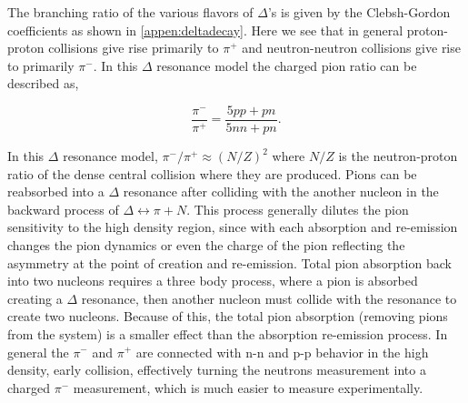 The branching ratio of the various flavors of $\Delta$'s is given by the Clebsh-Gordon coefficients as shown in \ref{appen:deltadecay}. Here we see that in general proton-proton collisions give rise primarily to  $\pi^+$ and neutron-neutron collisions give rise to primarily $\pi^-$. In this $\Delta$ resonance model the charged pion ratio can be described as,

\begin{equation}
\frac{\pi^-}{\pi^+} = \frac{ 5pp + pn }{5nn + pn}.
\label{eq:deltaModel}
\end{equation}

In this $\Delta$ resonance model, $\pi^-/\pi^+ \approx (N/Z)^2$ where $N/Z$ is the neutron-proton ratio of the dense central collision where they are produced. Pions can be reabsorbed into a $\Delta$ resonance after colliding with the another nucleon in the backward process of $\Delta \leftrightarrow \pi + N$. This process generally dilutes the pion sensitivity to the high density region, since with each absorption and re-emission changes the pion dynamics or even the charge of the pion reflecting the asymmetry at the point of creation and re-emission. Total pion absorption back into two nucleons requires a three body process, where a pion is absorbed creating a $\Delta$ resonance, then another nucleon must collide with the resonance to create two nucleons. Because of this, the total pion absorption (removing pions from the system) is a smaller effect than the absorption re-emission process. In general the $\pi^-$ and $\pi^+$ are connected with n-n and p-p behavior in the high density, early collision, effectively turning the neutrons  measurement into a charged $\pi^-$ measurement, which is much easier to measure experimentally. 

